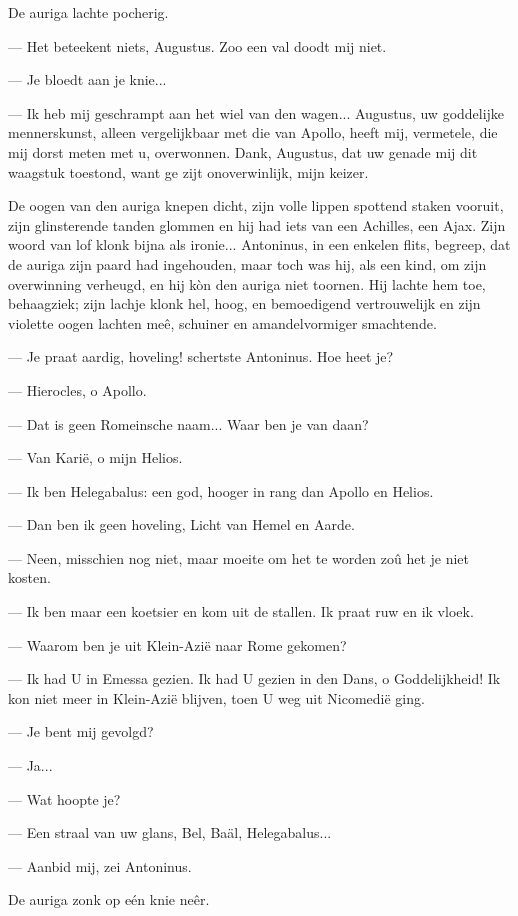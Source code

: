 \documentclass[a4paper, 12pt, oneside, dutch]{article}
\begin{document}
De auriga lachte pocherig.

--- Het beteekent niets, Augustus. Zoo een val doodt mij niet.

--- Je bloedt aan je knie...

--- Ik heb mij geschrampt aan het wiel van den wagen... Augustus, uw goddelijke mennerskunst, alleen vergelijkbaar met die van Apollo, heeft mij, vermetele, die mij dorst meten met u, overwonnen. Dank, Augustus, dat uw genade mij dit waagstuk toestond, want ge zijt onoverwinlijk, mijn keizer.

De oogen van den auriga knepen dicht, zijn volle lippen spottend staken vooruit, zijn glinsterende tanden glommen en hij had iets van een Achilles, een Ajax. Zijn woord van lof klonk bijna als ironie... Antoninus, in een enkelen flits, begreep, dat de auriga zijn paard had ingehouden, maar toch was hij, als een kind, om zijn overwinning verheugd, en hij kòn den auriga niet toornen. Hij lachte hem toe, behaagziek; zijn lachje klonk hel, hoog, en bemoedigend vertrouwelijk en zijn violette oogen lachten meê, schuiner en amandelvormiger smachtende.

--- Je praat aardig, hoveling! schertste Antoninus. Hoe heet je?

--- Hierocles, o Apollo.

--- Dat is geen Romeinsche naam... Waar ben je van daan?

--- Van Karië, o mijn Helios.

--- Ik ben Helegabalus: een god, hooger in rang dan Apollo en Helios.

--- Dan ben ik geen hoveling, Licht van Hemel en Aarde.

--- Neen, misschien nog niet, maar moeite om het te worden zoû het je niet kosten.

--- Ik ben maar een koetsier en kom uit de stallen. Ik praat ruw en ik vloek.

--- Waarom ben je uit Klein-Azië naar Rome gekomen?

--- Ik had U in Emessa gezien. Ik had U gezien in den Dans, o Goddelijkheid! Ik kon niet meer in Klein-Azië blijven, toen U weg uit Nicomedië ging.

--- Je bent mij gevolgd?

--- Ja...

--- Wat hoopte je?

--- Een straal van uw glans, Bel, Baäl, Helegabalus...

--- Aanbid mij, zei Antoninus.

De auriga zonk op eén knie neêr.
\end{document}
